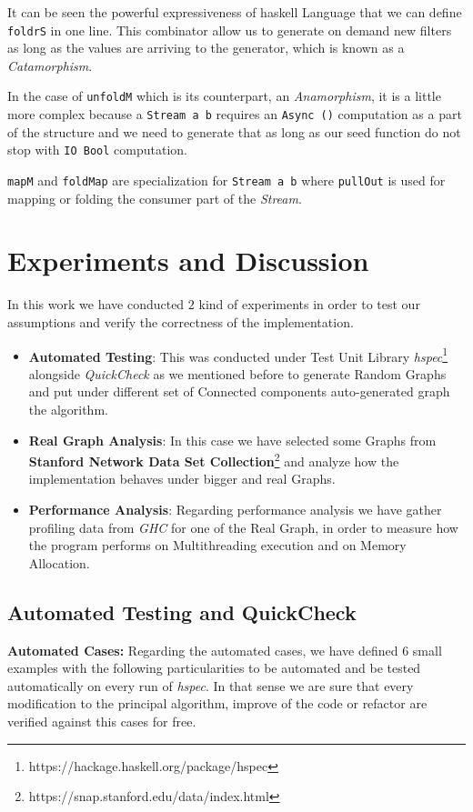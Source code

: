 \documentclass[12pt]{article}
\begin{document}
It can be seen the powerful expressiveness of \acrshort{haskell} Language that we can define \texttt{foldrS} in one line. This combinator
allow us to generate on demand new filters as long as the values are arriving to the generator, which is known as a \textit{Catamorphism}.

In the case of \texttt{unfoldM} which is its counterpart, an \textit{Anamorphism}, it is a little more complex because a \texttt{Stream a b} 
requires an \texttt{Async ()} computation as a part of the structure and we need to generate that as long as our seed function do not stop with \texttt{IO Bool} computation.

\texttt{mapM} and \texttt{foldMap} are specialization for \texttt{Stream a b} where \texttt{pullOut} is used for mapping or folding
the consumer part of the \textit{Stream}.

\section{Experiments and Discussion}
In this work we have conducted $2$ kind of experiments in order to test our assumptions and verify the correctness of the implementation.

\begin{itemize}
  \item \textbf{Automated Testing}: This was conducted under Test Unit Library \textit{hspec}\footnote{https://hackage.haskell.org/package/hspec} alongside \textit{QuickCheck} as we mentioned
  before to generate Random Graphs and put under different set of Connected components auto-generated graph the algorithm.
  \item \textbf{Real Graph Analysis}: In this case we have selected some Graphs from \textbf{Stanford Network Data Set Collection}\footnote{https://snap.stanford.edu/data/index.html} and analyze how the implementation
  behaves under bigger and real Graphs.
  \item \textbf{Performance Analysis}: Regarding performance analysis we have gather profiling data from \textit{GHC} for one of the Real Graph, in order to measure how the program performs on Multithreading execution and 
  on Memory Allocation.
\end{itemize}

\subsection{Automated Testing and QuickCheck}
\textbf{Automated Cases:} Regarding the automated cases, we have defined 6 small examples with the following particularities to be automated and be tested automatically on every run of \textit{hspec}. In that sense
we are sure that every modification to the principal algorithm, improve of the code or refactor are verified against this cases for free. 
\end{document}
